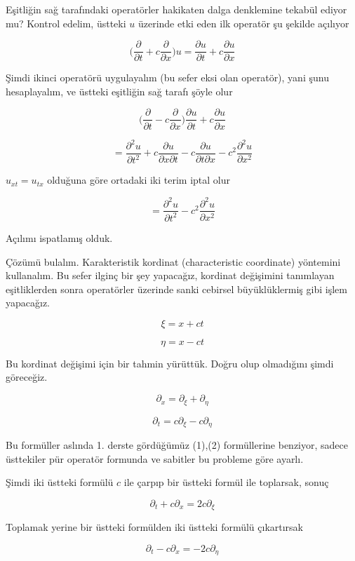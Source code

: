 \documentclass[12pt,fleqn]{article}\usepackage{../../common}
\begin{document}
Eşitliğin sağ tarafındaki operatörler hakikaten dalga denklemine tekabül
ediyor mu? Kontrol edelim, üstteki $u$ üzerinde etki eden ilk operatör şu
şekilde açılıyor

$$ \bigg( \frac{\partial }{\partial t} + c \frac{\partial }{\partial x}
\bigg) u = 
\frac{\partial u}{\partial t} + c \frac{\partial u}{\partial x}
$$

Şimdi ikinci operatörü uygulayalım (bu sefer eksi olan operatör), yani şunu
hesaplayalım, ve üstteki eşitliğin sağ tarafı şöyle olur

$$ 
\bigg( \frac{\partial }{\partial t} - c \frac{\partial }{\partial x} \bigg)
\frac{\partial u}{\partial t} + c \frac{\partial u}{\partial x} 
 $$

$$ = 
\frac{\partial ^2 u}{\partial t^2} + 
c \frac{\partial u}{\partial x \partial t} - 
c \frac{\partial u}{\partial t \partial x} - 
c^2\frac{\partial ^2 u}{\partial x^2} 
 $$

$u_{xt} = u_{tx}$ olduğuna göre ortadaki iki terim iptal olur

$$ = 
\frac{\partial ^2 u}{\partial t^2} -
c^2\frac{\partial ^2 u}{\partial x^2} 
 $$

Açılımı ispatlamış olduk. 

Çözümü bulalım. Karakteristik kordinat (characteristic coordinate)
yöntemini kullanalım. Bu sefer ilginç bir şey yapacağız, kordinat
değişimini tanımlayan eşitliklerden sonra operatörler üzerinde sanki
cebirsel büyüklüklermiş gibi işlem yapacağız. 

$$ \xi = x + ct $$

$$ \eta = x - ct $$

Bu kordinat değişimi için bir tahmin yürüttük. Doğru olup olmadığını şimdi
göreceğiz. 

$$ \partial_x = \partial_\xi + \partial_\eta $$

$$ \partial_t = c\partial_\xi - c \partial_\eta $$

Bu formüller aslında 1. derste gördüğümüz (1),(2) formüllerine benziyor,
sadece üsttekiler pür operatör formunda ve sabitler bu probleme göre
ayarlı. 

Şimdi iki üstteki formülü $c$ ile çarpıp bir üstteki formül ile toplarsak,
sonuç 

$$ \partial_t + c\partial_x = 2c \partial_\xi $$

Toplamak yerine bir üstteki formülden iki üstteki formülü çıkartırsak

$$ \partial_t - c\partial_x = -2c \partial_\eta $$
\end{document}
